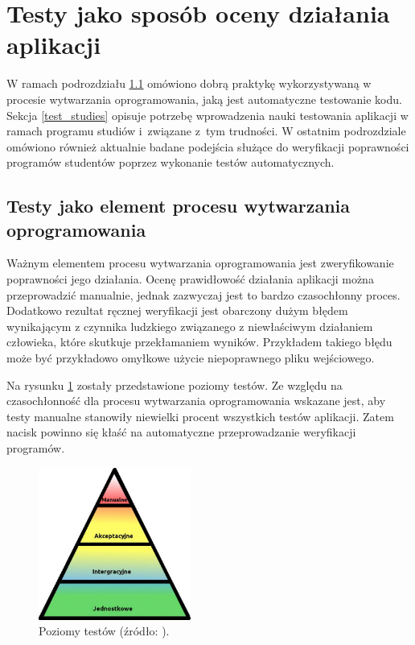 \vfill

\section{Testy jako sposób oceny działania aplikacji}
\label{programs-testing}

W ramach podrozdziału \ref{test_practices} omówiono dobrą praktykę wykorzystywaną w procesie wytwarzania oprogramowania, jaką jest automatyczne testowanie kodu.
Sekcja \ref{test_studies} opisuje potrzebę wprowadzenia nauki testowania aplikacji w ramach programu studiów i~związane z~tym trudności.
W ostatnim podrozdziale omówiono również aktualnie badane podejścia służące do weryfikacji poprawności programów studentów poprzez wykonanie testów automatycznych.

\subsection{Testy jako element procesu wytwarzania oprogramowania}
\label{test_practices}

Ważnym elementem procesu wytwarzania oprogramowania jest zweryfikowanie poprawności jego działania.
Ocenę prawidłowość działania aplikacji można przeprowadzić manualnie, jednak zazwyczaj jest to bardzo czasochłonny proces.
Dodatkowo rezultat ręcznej weryfikacji jest obarczony dużym błędem wynikającym z czynnika ludzkiego związanego z niewłaściwym działaniem człowieka, które skutkuje przekłamaniem wyników.
Przykładem takiego błędu może być przykładowo omyłkowe użycie niepoprawnego pliku wejściowego.

Na rysunku \ref{fig:tests-levels} zostały przedstawione poziomy testów.
Ze względu na czasochłonność dla procesu wytwarzania oprogramowania wskazane jest, aby testy manualne stanowiły niewielki procent wszystkich testów aplikacji.
Zatem nacisk powinno się kłaść na automatyczne przeprowadzanie weryfikacji programów.

\begin{figure}[h]
    \centering
    \includegraphics[width = 5cm]{chapter02/tests_levels.jpg}
    \caption{Poziomy testów (źródło: \cite{tests-levels}).}
    \label{fig:tests-levels}
\end{figure}

